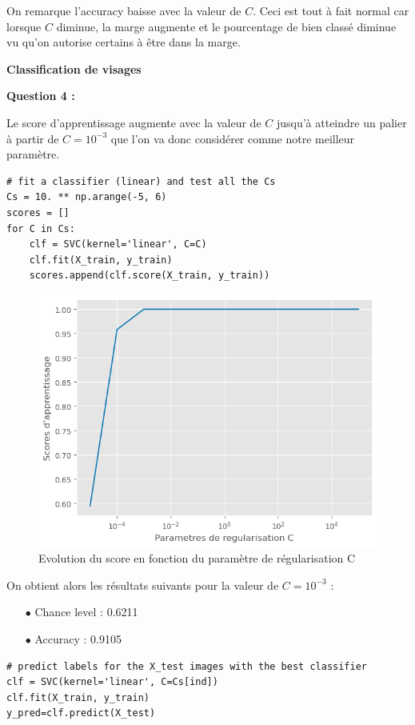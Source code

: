 \documentclass[10pt,a4paper]{article}
\begin{document}
On remarque l'accuracy baisse avec la valeur de $C$. Ceci est tout à fait normal car lorsque $C$ diminue, la marge augmente et le pourcentage de bien classé diminue vu qu'on autorise certains à être dans la marge. 
\bigskip

\begin{large}
\textbf{Classification de visages}
\end{large}


\textbf{Question 4 :}

Le score d'apprentissage augmente avec la valeur de $C$ jusqu'à atteindre un palier à partir de $C=10^{-3}$ que l'on va donc considérer comme notre meilleur paramètre.

\begin{lstlisting}
# fit a classifier (linear) and test all the Cs
Cs = 10. ** np.arange(-5, 6)
scores = []
for C in Cs:
    clf = SVC(kernel='linear', C=C)
    clf.fit(X_train, y_train)
    scores.append(clf.score(X_train, y_train))
\end{lstlisting}

\begin{figure}[H]
\centerline{\includegraphics[width=0.6\linewidth]{images/score_vs_C.png}}
\caption{Evolution du score en fonction du paramètre de régularisation C}
\label{fig:sc_vs_c}
\end{figure}

On obtient alors les résultats suivants pour la valeur de $C=10^{-3}$ : 

\begin{itemize}
\item[$\bullet$] Chance level : 0.6211
\item[$\bullet$] Accuracy : 0.9105
\end{itemize}

\begin{lstlisting}
# predict labels for the X_test images with the best classifier
clf = SVC(kernel='linear', C=Cs[ind])
clf.fit(X_train, y_train)
y_pred=clf.predict(X_test)
\end{lstlisting}
\end{document}
